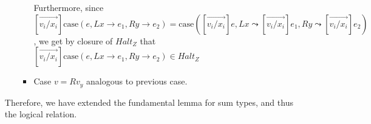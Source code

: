 \begin{enumerate}
\begin{itemize}
\begin{itemize}
            Furthermore, since $[\overrightarrow{v_i / x_i}]\text{case}(e, L x \rightarrow e_1, R y \rightarrow e_2) = \text{case}([\overrightarrow{v_i / x_i}]e, L x \leadsto [\overrightarrow{v_i / x_i}]e_1, R y \leadsto [\overrightarrow{v_i / x_i}]e_2)$, we get by closure of $Halt_Z$ that $[\overrightarrow{v_i / x_i}]\text{case}(e, L x \rightarrow e_1, R y \rightarrow e_2) \in Halt_Z$

            
          \item
            Case $v = R v_y$ analogous to previous case.

        \end{itemize}
    \end{itemize}

    Therefore, we have extended the fundamental lemma for sum types, and thus the logical relation.
    \end{enumerate}

